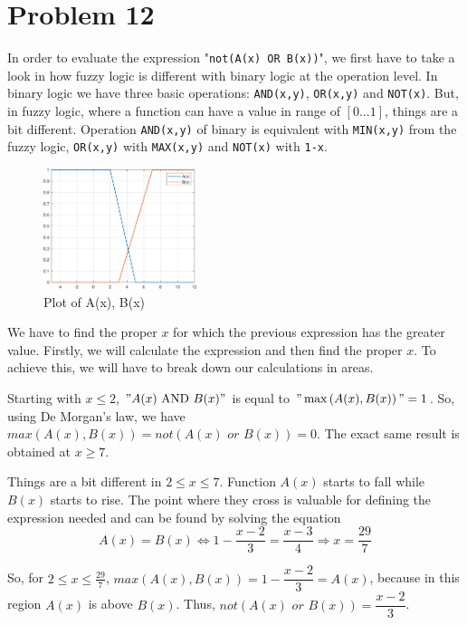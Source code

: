 \section{Problem 12}

In order to evaluate the expression "\verb|not(A(x) OR B(x))|", we first have to take a look in how fuzzy logic is different with binary logic at the operation level.
In binary logic we have three basic operations: \verb*|AND(x,y)|, \verb*|OR(x,y)| and \verb*|NOT(x)|. But, in fuzzy logic, where a function can have a value in range of $\left[0...1\right]$, things are a bit different.
Operation \verb*|AND(x,y)| of binary is equivalent with \verb|MIN(x,y)| from the fuzzy logic, \verb*|OR(x,y)| with \verb*|MAX(x,y)| and \verb*|NOT(x)| with \verb|1-x|.

\begin{figure}
	\centering
	\includegraphics[width=0.4\textwidth]{../Problem 12/a_b_functions.pdf}
	\caption{Plot of A(x), B(x)}
	\label{fig:prob_12_a_b}
\end{figure}

We have to find the proper $x$ for which the previous expression has the greater value. Firstly, we will calculate the expression and then find the proper $x$.
To achieve this, we will have to break down our calculations in areas. 

Starting with $x \le 2$, $"A(x) \text{ AND } B(x)"$ is equal to $"\max\left(A(x), B(x)\right)" = 1$. So, using De Morgan's law, we have $\textit{max}\left(A(x), B(x)\right) = \textit{not}\left(A(x) \textit{ or } B(x)\right) = 0$.
The exact same result is obtained at $x \ge 7$.

Things are a bit different in $2 \le x \le 7$. Function $A(x)$ starts to fall while $B(x)$ starts to rise. The point where they cross is valuable for defining the expression needed and can be found by solving the equation 
\[
A(x) = B(x) \Leftrightarrow 1 - \frac{x-2}{3} = \frac{x-3}{4} \Rightarrow x = \frac{29}{7}
\]

So, for $2 \le x \le \frac{29}{7}$, $\textit{max}\left(A(x), B(x)\right) = 1 - \dfrac{x-2}{3} = A(x)$, because in this region $A(x)$ is above $B(x)$. Thus, $\textit{not}\left(A(x) \textit{ or } B(x)\right) = \dfrac{x-2}{3}$.

